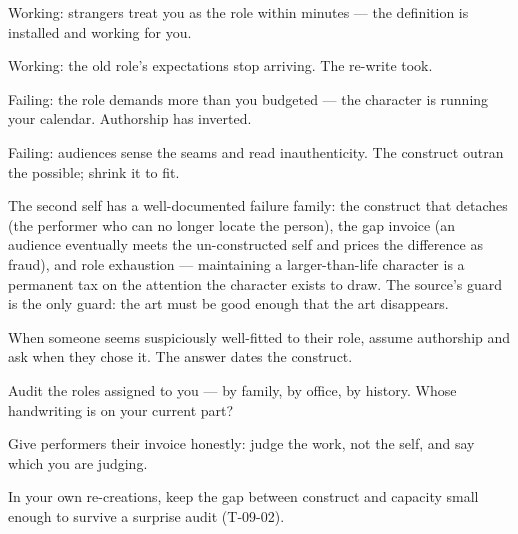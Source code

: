 \begin{feedback}
  \item Working: strangers treat you as the role within minutes --- the definition is installed and working for you.
  \item Working: the old role's expectations stop arriving. The re-write took.
  \item Failing: the role demands more than you budgeted --- the character is running your calendar. Authorship has inverted.
  \item Failing: audiences sense the seams and read inauthenticity. The construct outran the possible; shrink it to fit.
\end{feedback}
\begin{failure}
The second self has a well-documented failure family: the construct that detaches (the performer who can no longer locate the person), the gap invoice (an audience eventually meets the un-constructed self and prices the difference as fraud), and role exhaustion --- maintaining a larger-than-life character is a permanent tax on the attention the character exists to draw. The source's guard is the only guard: the art must be good enough that the art disappears.
\end{failure}
\begin{countermeasures}
  \item When someone seems suspiciously well-fitted to their role, assume authorship and ask when they chose it. The answer dates the construct.
  \item Audit the roles assigned to you --- by family, by office, by history. Whose handwriting is on your current part?
  \item Give performers their invoice honestly: judge the work, not the self, and say which you are judging.
  \item In your own re-creations, keep the gap between construct and capacity small enough to survive a surprise audit (T-09-02).
\end{countermeasures}

\seesources
{}
